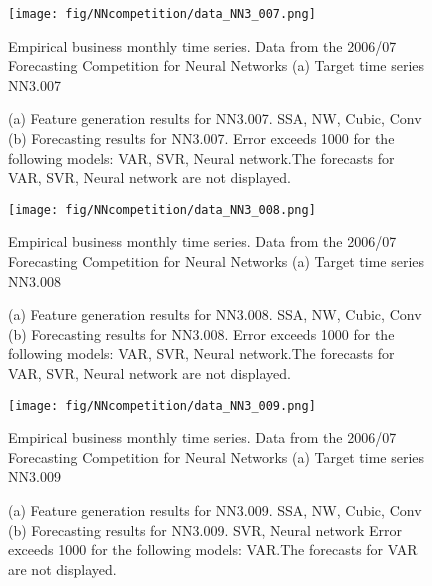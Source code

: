 \documentclass[12pt]{article}
\begin{document}
\begin{figure}
\centering
\texttt{[image: fig/NNcompetition/data\_NN3\_007.png]}
\caption{Empirical business monthly time series. Data from the 2006/07 Forecasting Competition for Neural Networks	(a) Target time series	NN3.007	}
\end{figure}


\begin{figure}
\centering
{}
\caption{(a)	Feature generation results for	NN3.007.	SSA, NW, Cubic, Conv	(b)	Forecasting results for	NN3.007.		Error exceeds 1000 for the following models: VAR, SVR, Neural network.The forecasts for VAR, SVR, Neural network are not displayed.	}
\end{figure}


\begin{figure}
\centering
\texttt{[image: fig/NNcompetition/data\_NN3\_008.png]}
\caption{Empirical business monthly time series. Data from the 2006/07 Forecasting Competition for Neural Networks	(a) Target time series	NN3.008	}
\end{figure}


\begin{figure}
\centering
{}
\caption{(a)	Feature generation results for	NN3.008.	SSA, NW, Cubic, Conv	(b)	Forecasting results for	NN3.008.		Error exceeds 1000 for the following models: VAR, SVR, Neural network.The forecasts for VAR, SVR, Neural network are not displayed.	}
\end{figure}


\begin{figure}
\centering
\texttt{[image: fig/NNcompetition/data\_NN3\_009.png]}
\caption{Empirical business monthly time series. Data from the 2006/07 Forecasting Competition for Neural Networks	(a) Target time series	NN3.009	}
\end{figure}


\begin{figure}
\centering
{}
\caption{(a)	Feature generation results for	NN3.009.	SSA, NW, Cubic, Conv	(b)	Forecasting results for	NN3.009.	SVR, Neural network	Error exceeds 1000 for the following models: VAR.The forecasts for VAR are not displayed.	}
\end{figure}
\end{document}
